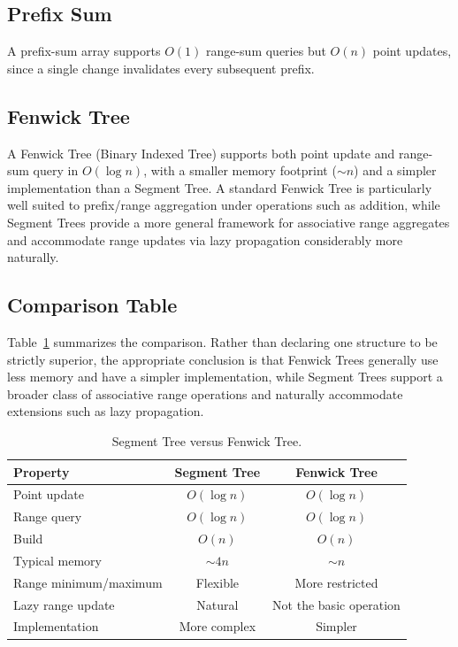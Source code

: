 \documentclass[11pt]{scrartcl}
\begin{document}
\subsection{Prefix Sum}
A prefix-sum array supports $O(1)$ range-sum queries but $O(n)$ point updates, since a single change invalidates every subsequent prefix.

\subsection{Fenwick Tree}
A Fenwick Tree (Binary Indexed Tree) supports both point update and range-sum query in $O(\log n)$, with a smaller memory footprint ($\sim n$) and a simpler implementation than a Segment Tree. A standard Fenwick Tree is particularly well suited to prefix/range aggregation under operations such as addition, while Segment Trees provide a more general framework for associative range aggregates and accommodate range updates via lazy propagation considerably more naturally.

\subsection{Comparison Table}
Table~\ref{tab:comparison} summarizes the comparison. Rather than declaring one structure to be strictly superior, the appropriate conclusion is that Fenwick Trees generally use less memory and have a simpler implementation, while Segment Trees support a broader class of associative range operations and naturally accommodate extensions such as lazy propagation.

\begin{table}[h]
\centering
\caption{Segment Tree versus Fenwick Tree.}
\label{tab:comparison}
\begin{tabular}{lcc}
\toprule
\textbf{Property} & \textbf{Segment Tree} & \textbf{Fenwick Tree} \\
\midrule
Point update            & $O(\log n)$ & $O(\log n)$ \\
Range query              & $O(\log n)$ & $O(\log n)$ \\
Build                    & $O(n)$      & $O(n)$ \\
Typical memory           & $\sim 4n$   & $\sim n$ \\
Range minimum/maximum    & Flexible    & More restricted \\
Lazy range update        & Natural     & Not the basic operation \\
Implementation           & More complex& Simpler \\
\bottomrule
\end{tabular}
\end{table}
\end{document}
